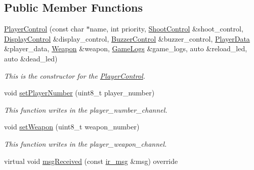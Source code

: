 \subsection*{Public Member Functions}
\begin{DoxyCompactItemize}
\item 
\mbox{\hyperlink{class_player_control_af026842ca91afba7f60da162f6fc527e}{Player\+Control}} (const char $\ast$name, int priority, \mbox{\hyperlink{class_shoot_control}{Shoot\+Control}} \&shoot\+\_\+control, \mbox{\hyperlink{class_display_control}{Display\+Control}} \&display\+\_\+control, \mbox{\hyperlink{class_buzzer_control}{Buzzer\+Control}} \&buzzer\+\_\+control, \mbox{\hyperlink{class_player_data}{Player\+Data}} \&player\+\_\+data, \mbox{\hyperlink{class_weapon}{Weapon}} \&weapon, \mbox{\hyperlink{class_game_logs}{Game\+Logs}} \&game\+\_\+logs, auto \&reload\+\_\+led, auto \&dead\+\_\+led)
\begin{DoxyCompactList}\small\item\em This is the constructor for the \mbox{\hyperlink{class_player_control}{Player\+Control}}. \end{DoxyCompactList}\item 
\mbox{\label{class_player_control_af62429d7e940448496a196abf1bdc51f}} 
void \mbox{\hyperlink{class_player_control_af62429d7e940448496a196abf1bdc51f}{set\+Player\+Number}} (uint8\+\_\+t player\+\_\+number)
\begin{DoxyCompactList}\small\item\em This function writes in the player\+\_\+number\+\_\+channel. \end{DoxyCompactList}\item 
\mbox{\label{class_player_control_a73d535a1e16aadc234c6cd59e466305f}} 
void \mbox{\hyperlink{class_player_control_a73d535a1e16aadc234c6cd59e466305f}{set\+Weapon}} (uint8\+\_\+t weapon\+\_\+number)
\begin{DoxyCompactList}\small\item\em This function writes in the player\+\_\+weapon\+\_\+channel. \end{DoxyCompactList}\item 
\mbox{\label{class_player_control_a0d9fe3c384a800e4cd17cf15103b42c2}} 
virtual void \mbox{\hyperlink{class_player_control_a0d9fe3c384a800e4cd17cf15103b42c2}{msg\+Received}} (const \mbox{\hyperlink{structir__msg}{ir\+\_\+msg}} \&msg) override

\end{DoxyCompactItemize}
